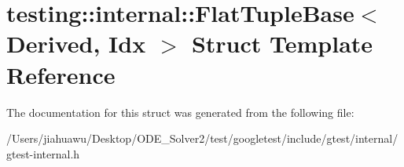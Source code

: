 \hypertarget{structtesting_1_1internal_1_1_flat_tuple_base}{}\section{testing\+:\+:internal\+:\+:Flat\+Tuple\+Base$<$ Derived, Idx $>$ Struct Template Reference}
\label{structtesting_1_1internal_1_1_flat_tuple_base}


The documentation for this struct was generated from the following file\+:\begin{DoxyCompactItemize}
\item 
/\+Users/jiahuawu/\+Desktop/\+O\+D\+E\+\_\+\+Solver2/test/googletest/include/gtest/internal/gtest-\/internal.\+h\end{DoxyCompactItemize}
